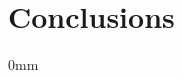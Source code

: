 \documentclass[./main.tex]{subfiles}
\begin{document}
\section{Conclusions} \label{conclusions}

\begin{adjustwidth}{\bodytab}{0mm}



\end{adjustwidth}
\end{document}
